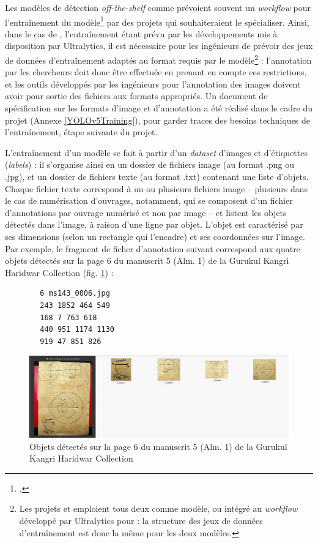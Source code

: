 	Les modèles de détection \textit{off-the-shelf} comme \yolov prévoient souvent un \textit{workflow} pour l'entraînement du modèle\footcite{sharmaTrainingYOLOv5Object2022} par des projets qui souhaiteraient le spécialiser. Ainsi, dans le cas de \yolov, l'entraînement étant prévu par les développements mis à disposition par Ultralytics, il est nécessaire pour les ingénieurs de prévoir des jeux de données d'entraînement adaptés au format requis par le modèle\footnote{Les projets \vhs et \eida emploient tous deux \yolov comme modèle, ou \docex intégré au \textit{workflow} développé par Ultralytics pour \yolov : la structure des jeux de données d'entraînement est donc la même pour les deux modèles.} : l'annotation par les chercheurs doit donc être effectuée en prenant en compte ces restrictions, et les outils développés par les ingénieurs pour l'annotation des images doivent avoir pour sortie des fichiers aux formats appropriés. Un document de spécification sur les formats d'image et d'annotation a été réalisé dans le cadre du projet \eida (Annexe \ref{YOLOv5Training}), pour garder traces des besoins techniques de l'entraînement, étape suivante du projet. 
	
	L'entraînement d'un modèle \yolov se fait à partir d'un \textit{dataset} d'images et d'étiquettes (\textit{labels}) : il s'organise ainsi en un dossier de fichiers image (au format .png ou .jpg), et un dossier de fichiers texte (au format .txt) contenant une liste d'objets. Chaque fichier texte correspond à un ou plusieurs fichiers image -- plusieurs dans le cas de numérisation d'ouvrages, notamment, qui se composent d'un fichier d'annotations par ouvrage numérisé et non par image -- et listent les objets détectés dans l'image, à raison d'une ligne par objet. L'objet est caractérisé par ses dimensions (selon un rectangle qui l'encadre) et ses coordonnées sur l'image. Par exemple, le fragment de ficher d'annotation suivant correspond aux quatre objets détectés sur la page 6 du manuscrit 5 (Alm. 1) de la Gurukul Kangri Haridwar Collection (fig. \ref{fig:annotation_ms143}) :
	
	\begin{lstlisting}
		6 ms143_0006.jpg
		243 1852 464 549
		168 7 763 618
		440 951 1174 1130
		919 47 851 826\end{lstlisting}

   	\begin{figure}[H]
		\centering
		\includegraphics[width=15cm]{images/ms143_p6.png}
		\caption{Objets détectés sur la page 6 du manuscrit 5 (Alm. 1) de la Gurukul Kangri Haridwar Collection }
		\label{fig:annotation_ms143}
	\end{figure}

